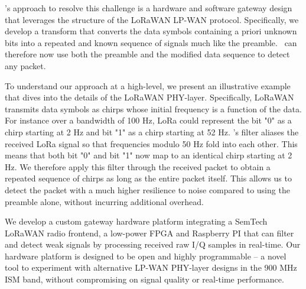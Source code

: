 \name's approach to resolve this challenge is a hardware and software gateway design that leverages the structure of the LoRaWAN LP-WAN protocol. Specifically, we develop a transform that converts the data symbols containing a priori unknown bits into a repeated and known sequence of signals much like the preamble. \name\ can therefore now use both the preamble and the modified data sequence to detect any packet. 


To understand our approach at a high-level, we present an illustrative example that dives into the details of the LoRaWAN PHY-layer. Specifically, LoRaWAN transmits data symbols as chirps whose initial frequency is a function of the data. For instance over a bandwidth of 100 Hz, LoRa could represent the bit "0" as a chirp starting at 2 Hz and bit "1" as a chirp starting at 52 Hz. \name's filter aliases the received LoRa signal so that frequencies modulo 50 Hz fold into each other. This means that both bit "0" and bit "1" now map to an identical chirp starting at 2 Hz. We therefore apply this filter through the received packet to obtain a repeated sequence of chirps as long as the entire packet itself. This allows us to detect the packet with a much higher resilience to noise compared to using the preamble alone, without incurring additional overhead. 

We develop a custom gateway hardware platform integrating a SemTech LoRaWAN radio frontend, a low-power FPGA and Raspberry PI that can filter and detect weak signals by processing received raw I/Q samples in real-time. Our hardware platform is designed to be open and highly programmable -- a novel tool to experiment with alternative LP-WAN PHY-layer designs in the 900 MHz ISM band, without compromising on signal quality or real-time performance. 
 



